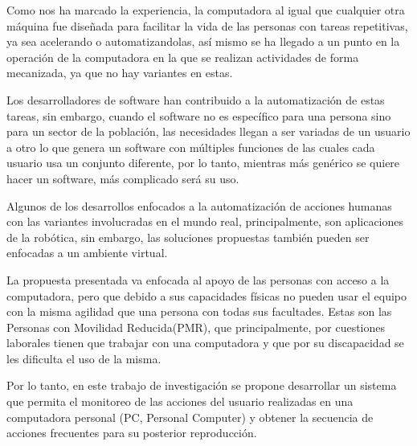 
Como nos ha marcado la experiencia, la computadora al igual que cualquier
 otra m\'aquina fue dise\~nada para facilitar la vida de las personas con 
 tareas repetitivas, ya sea acelerando o automatizandolas, as\'i mismo se 
 ha llegado a un punto en la operaci\'on de la computadora en la que se 
 realizan actividades de forma mecanizada, ya que no hay variantes en estas.  

Los desarrolladores de software han contribuido a la automatizaci\'on de 
 estas tareas, sin embargo, cuando el software no es espec\'ifico para una 
 persona sino para un sector de la poblaci\'on, las necesidades llegan a ser 
 variadas de un usuario a otro lo que genera un software con m\'ultiples 
 funciones de las cuales cada usuario usa un conjunto diferente, por lo 
 tanto, mientras m\'as gen\'erico se quiere hacer un software, m\'as 
 complicado ser\'a su uso. 

Algunos de los desarrollos enfocados a la automatizaci\'on de acciones 
 humanas con las variantes involucradas en el mundo real, principalmente, son  
 aplicaciones de la rob\'otica, sin embargo, las soluciones propuestas 
 tambi\'en pueden ser enfocadas a un ambiente virtual.

La propuesta presentada va enfocada al apoyo de las personas con acceso a la
 computadora, pero que debido a sus capacidades f\'isicas no pueden usar el 
 equipo con la misma agilidad que una persona con todas sus facultades. Estas 
 son las Personas con Movilidad Reducida(PMR), que principalmente, por 
 cuestiones laborales tienen que trabajar con una computadora y que por su 
 discapacidad se les dificulta el uso de la misma.

Por lo tanto, en este trabajo de investigaci\'on se propone desarrollar un 
 sistema que permita el monitoreo de las acciones del usuario realizadas en 
 una computadora personal (PC, Personal Computer) y obtener la secuencia de 
 acciones frecuentes para su posterior reproducci\'on.
 
 